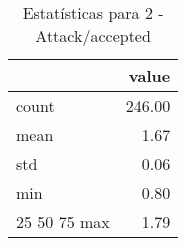 \begin{table}[htbp]
\caption{Estatísticas para 2 - Attack/accepted}
\label{tab:2_-_attack_accepted_summary}
\begin{tabular}{lr}
\toprule
 & value \\
\midrule
count & 246.00 \\
mean & 1.67 \\
std & 0.06 \\
min & 0.80 \\
25%
50%
75%
max & 1.79 \\
\bottomrule
\end{tabular}
\end{table}

